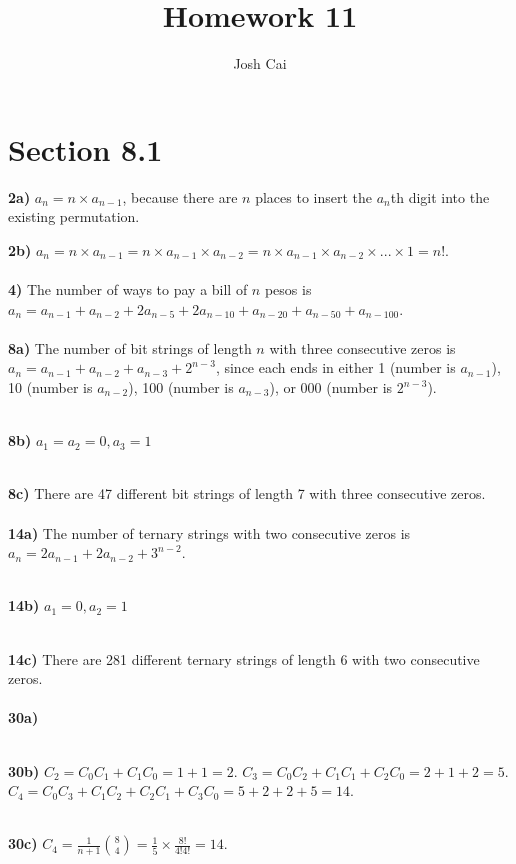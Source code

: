 \documentclass{article}
\begin{document}
\title{Homework 11}
\author{Josh Cai}

\maketitle
\section*{Section 8.1}

\noindent\textbf{2a)} $a_n = n \times a_{n-1}$, because there are $n$ places to insert the $a_n$th digit into the existing permutation.

\noindent\textbf{2b)} $a_n = n \times a_{n-1} = n \times a_{n-1} \times a_{n-2} =  n \times a_{n-1} \times a_{n-2} \times . . . \times 1 = n!$.
\\\\\noindent\textbf{4)} The number of ways to pay a bill of $n$ pesos is $a_n = a_{n-1} + a_{n-2}+2a_{n-5}+2a_{n-10}+a_{n-20}+a_{n-50}+a_{n-100}$.
\\\\\noindent\textbf{8a)} The number of bit strings of length $n$ with three consecutive zeros is $a_{n}=a_{n-1}+a_{n-2}+a_{n-3}+2^{n-3}$, since each ends in either 1 (number is $a_{n-1}$), 10 (number is $a_{n-2}$), 100 (number is $a_{n-3}$), or 000 (number is $2^{n-3}$).

\\\noindent\textbf{8b)} $a_1 = a_2 = 0, a_3 = 1$

\\\noindent\textbf{8c)} There are 47 different bit strings of length 7 with three consecutive zeros.
\\\\\noindent\textbf{14a)} The number of ternary strings with two consecutive zeros is $a_n = 2a_{n-1}+2a_{n-2}+3^{n-2}$.

\\\noindent\textbf{14b)} $a_1 = 0, a_2 = 1$

\\\noindent\textbf{14c)} There are 281 different ternary strings of length 6 with two consecutive zeros.
\\\\\noindent\textbf{30a)} 

\\\noindent\textbf{30b)} $C_2 = C_0C_1+C_1C_0 = 1+1 = 2$. $C_3 = C_0C_2+C_1C_1+C_2C_0 = 2+1+2 = 5$. $C_4 = C_0C_3+C_1C_2+C_2C_1+C_3C_0 = 5+2+2+5 = 14$.

\\\noindent\textbf{30c)} $C_4 = \frac{1}{n+1} \binom{8}{4} = \frac{1}{5} \times \frac{8!}{4!4!} = 14$.
\end{document}
